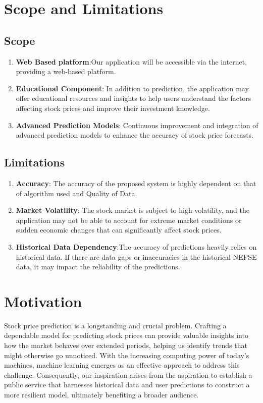 \documentclass[./main.tex]{subfiles}
\begin{document}
\section{Scope and Limitations}
\subsection{Scope}
\begin{enumerate}[label=\textasteriskcentered]
    \item \textbf{Web Based platform}:Our application will be accessible via the internet, providing a web-based platform.
    \item \textbf{Educational Component}: In addition to prediction, the application may offer educational resources and insights to help users understand the factors affecting stock prices and improve their investment knowledge.
   \item \textbf{ Advanced Prediction Models}: Continuous improvement and integration of advanced prediction models to enhance the accuracy of stock price forecasts.
 
\end{enumerate}
\subsection{Limitations}
\begin{enumerate}[label=\textasteriskcentered]
    \item \textbf{Accuracy}: The accuracy of the proposed system is highly dependent on that of algorithm used and Quality of Data.  
    \item \textbf{Market Volatility}: The stock market is subject to high volatility, and the application may not be able to account for extreme market conditions or sudden economic changes that can significantly affect stock prices.
    \item \textbf{Historical Data Dependency}:The accuracy of predictions heavily relies on historical data. If there are data gaps or inaccuracies in the historical NEPSE data, it may impact the reliability of the predictions.
\end{enumerate}

\section{Motivation}
Stock price prediction is a longstanding and crucial problem. Crafting a dependable model for predicting stock prices can provide valuable insights into how the market behaves over extended periods, helping us identify trends that might otherwise go unnoticed. With the increasing computing power of today's machines, machine learning emerges as an effective approach to address this challenge. Consequently, our inspiration arises from the aspiration to establish a public service that harnesses historical data and user predictions to construct a more resilient model, ultimately benefiting a broader audience.
\end{document}
